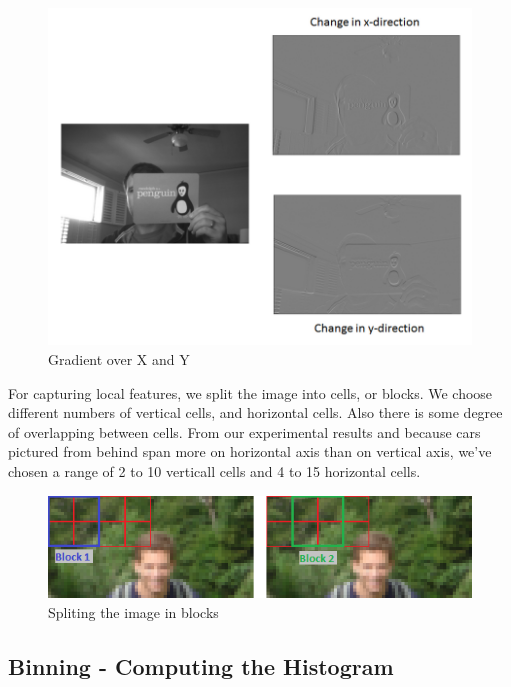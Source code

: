 \begin{figure}[htb]
	\begin{center}
		\includegraphics[scale=0.6]{img/gradients.png}
	    \caption{Gradient over X and Y \label{img:gradients}}
    \end{center}
\end{figure}

For capturing local features, we split the image into cells, or blocks. We choose different numbers of vertical cells, and horizontal cells. Also there is some degree of overlapping between cells. From our experimental results and because cars pictured from behind span more on horizontal axis than on vertical axis, we've chosen a range of 2 to 10 verticall cells and 4 to 15 horizontal cells.

\begin{figure}[htb]
	\begin{center}
		\includegraphics[scale=0.7]{img/blocks.png}
	    \caption{Spliting the image in blocks \label{img:blocks}}
    \end{center}
\end{figure}

\subsection{Binning - Computing the Histogram}

